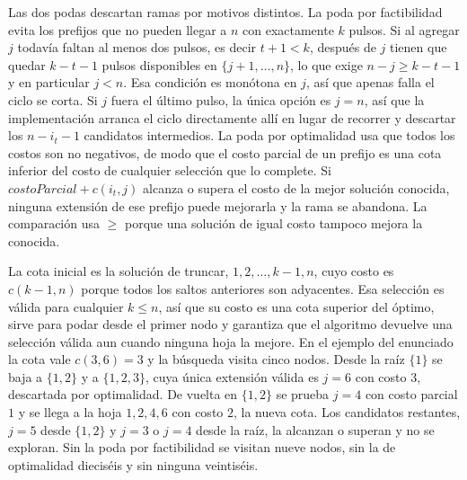 Las dos podas descartan ramas por motivos distintos. La poda por factibilidad evita los prefijos que no pueden llegar a $n$ con exactamente $k$ pulsos. Si al agregar $j$ todavía faltan al menos dos pulsos, es decir $t + 1 < k$, después de $j$ tienen que quedar $k - t - 1$ pulsos disponibles en $\{j+1, \ldots, n\}$, lo que exige $n - j \ge k - t - 1$ y en particular $j < n$. Esa condición es monótona en $j$, así que apenas falla el ciclo se corta. Si $j$ fuera el último pulso, la única opción es $j = n$, así que la implementación arranca el ciclo directamente allí en lugar de recorrer y descartar los $n - i_t - 1$ candidatos intermedios. La poda por optimalidad usa que todos los costos son no negativos, de modo que el costo parcial de un prefijo es una cota inferior del costo de cualquier selección que lo complete. Si $\mathit{costoParcial} + c(i_t, j)$ alcanza o supera el costo de la mejor solución conocida, ninguna extensión de ese prefijo puede mejorarla y la rama se abandona. La comparación usa $\ge$ porque una solución de igual costo tampoco mejora la conocida.

La cota inicial es la solución de truncar, $1, 2, \ldots, k-1, n$, cuyo costo es $c(k-1, n)$ porque todos los saltos anteriores son adyacentes. Esa selección es válida para cualquier $k \le n$, así que su costo es una cota superior del óptimo, sirve para podar desde el primer nodo y garantiza que el algoritmo devuelve una selección válida aun cuando ninguna hoja la mejore. En el ejemplo del enunciado la cota vale $c(3,6) = 3$ y la búsqueda visita cinco nodos. Desde la raíz $\{1\}$ se baja a $\{1,2\}$ y a $\{1,2,3\}$, cuya única extensión válida es $j = 6$ con costo $3$, descartada por optimalidad. De vuelta en $\{1,2\}$ se prueba $j = 4$ con costo parcial $1$ y se llega a la hoja $1, 2, 4, 6$ con costo $2$, la nueva cota. Los candidatos restantes, $j = 5$ desde $\{1,2\}$ y $j = 3$ o $j = 4$ desde la raíz, la alcanzan o superan y no se exploran. Sin la poda por factibilidad se visitan nueve nodos, sin la de optimalidad dieciséis y sin ninguna veintiséis.

